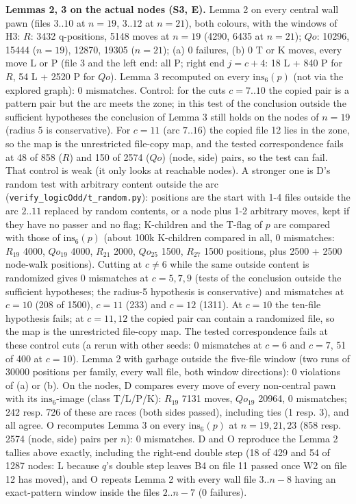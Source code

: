 \textbf{Lemmas 2, 3 on the actual nodes (S3, E).} Lemma 2 on every central wall pawn (files $3..10$ at $n=19$, $3..12$ at $n=21$), both colours, with the windows of H3: $R$: 3432 q-positions, 5148 moves at $n=19$ (4290, 6435 at $n=21$); $Qo$: 10296, 15444 ($n=19$), 12870, 19305 ($n=21$); (a) 0 failures, (b) 0 T or K moves, every move L or P (file 3 and the left end: all P; right end $j=c+4$: 18 L + 840 P for $R$, 54 L + 2520 P for $Qo$). Lemma 3 recomputed on every $\mathrm{ins}_6(p)$ (not via the explored graph): 0 mismatches. Control: for the cuts $c=7..10$ the copied pair is a pattern pair but the arc meets the zone; in this test of the conclusion outside the sufficient hypotheses the conclusion of Lemma 3 still holds on the nodes of $n=19$ (radius 5 is conservative). For $c=11$ (arc $7..16$) the copied file 12 lies in the zone, so the map is the unrestricted file-copy map, and the tested correspondence fails at 48 of 858 ($R$) and 150 of 2574 ($Qo$) (node, side) pairs, so the test can fail. That control is weak (it only looks at reachable nodes). A stronger one is D's random test with arbitrary content outside the arc (\texttt{verify\_logicOdd/t\_random.py}): positions are the start with 1-4 files outside the arc $2..11$ replaced by random contents, or a node plus 1-2 arbitrary moves, kept if they have no passer and no flag; K-children and the T-flag of $p$ are compared with those of $\mathrm{ins}_6(p)$ (about 100k K-children compared in all, 0 mismatches: $R_{19}$ 4000, $Qo_{19}$ 4000, $R_{21}$ 2000, $Qo_{25}$ 1500, $R_{27}$ 1500 positions, plus 2500 + 2500 node-walk positions). Cutting at $c\ne6$ while the same outside content is randomized gives 0 mismatches at $c=5,7,9$ (tests of the conclusion outside the sufficient hypotheses; the radius-5 hypothesis is conservative) and mismatches at $c=10$ (208 of 1500), $c=11$ (233) and $c=12$ (1311). At $c=10$ the ten-file hypothesis fails; at $c=11,12$ the copied pair can contain a randomized file, so the map is the unrestricted file-copy map. The tested correspondence fails at these control cuts (a rerun with other seeds: 0 mismatches at $c=6$ and $c=7$, 51 of 400 at $c=10$). Lemma 2 with garbage outside the five-file window (two runs of 30000 positions per family, every wall file, both window directions): 0 violations of (a) or (b). On the nodes, D compares every move of every non-central pawn with its $\mathrm{ins}_6$-image (class T/L/P/K): $R_{19}$ 7131 moves, $Qo_{19}$ 20964, 0 mismatches; 242 resp. 726 of these are races (both sides passed), including ties (1 resp. 3), and all agree. O recomputes Lemma 3 on every $\mathrm{ins}_6(p)$ at $n=19,21,23$ (858 resp. 2574 (node, side) pairs per $n$): 0 mismatches. D and O reproduce the Lemma 2 tallies above exactly, including the right-end double step (18 of 429 and 54 of 1287 nodes: L because $q$'s double step leaves B4 on file 11 passed once W2 on file 12 has moved), and O repeats Lemma 2 with every wall file $3..n-8$ having an exact-pattern window inside the files $2..n-7$ (0 failures).

